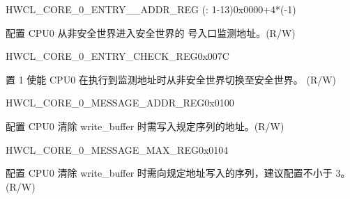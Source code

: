 \begin{register}{H}{WCL\_CORE\_0\_ENTRY\_\_ADDR\_REG (: 1-13)}{0x{}0000+4*(-1)}\label{regdesc:WCLCORE0ENTRYnADDRREG}
%
\regnewline%
\begin{regdesc}\begin{reglist}
\label{fielddesc:WCLCORE0ENTRY1ADDR}\item [WCL\_CORE\_0\_ENTRY\_\regindex{n}\_ADDR] 配置 CPU0 从非安全世界进入安全世界的  号入口监测地址。(R/W)
\end{reglist}\end{regdesc}
\end{register}


\begin{register}{H}{WCL\_CORE\_0\_ENTRY\_CHECK\_REG}{0x{}007C}\label{regdesc:WCLCORE0ENTRYCHECKREG}
%
%
%
\regnewline%
\begin{regdesc}\begin{reglist}
\label{fielddesc:WCLCORE0ENTRYCHECK}\item [WCL\_CORE\_0\_ENTRY\_CHECK] 置 1 使能 CPU0 在执行到监测地址时从非安全世界切换至安全世界。 (R/W)
\end{reglist}\end{regdesc}
\end{register}


\begin{register}{H}{WCL\_CORE\_0\_MESSAGE\_ADDR\_REG}{0x{}0100}\label{regdesc:WCLCORE0MESSAGEADDRREG}
%
\regnewline%
\begin{regdesc}\begin{reglist}
\label{fielddesc:WCLCORE0MESSAGEADDR}\item [WCL\_CORE\_0\_MESSAGE\_ADDR] 配置 CPU0 清除 write\_buffer 时需写入规定序列的地址。(R/W)
\end{reglist}\end{regdesc}
\end{register}


\begin{register}{H}{WCL\_CORE\_0\_MESSAGE\_MAX\_REG}{0x{}0104}\label{regdesc:WCLCORE0MESSAGEMAXREG}
%
%
\regnewline%
\begin{regdesc}\begin{reglist}
\label{fielddesc:WCLCORE0MESSAGEMAX}\item [WCL\_CORE\_0\_MESSAGE\_MAX] 配置 CPU0 清除 write\_buffer 时需向规定地址写入的序列，建议配置不小于 3。(R/W)
\end{reglist}\end{regdesc}
\end{register}


